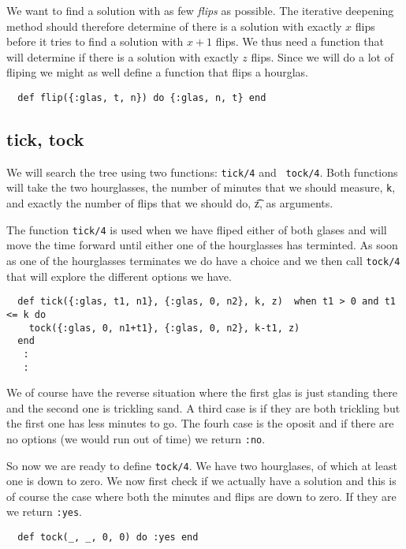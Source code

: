\documentclass[a4paper,11pt]{article}
\begin{document}
We want to find a solution with as few {\em flips} as
possible. The iterative deepening method should therefore determine of
there is a solution with exactly $x$ flips before it tries to find a
solution with $x+1$ flips. We thus need a function that will determine
if there is a solution with exactly $z$ flips. Since we will do a lot
of fliping we might as well define a function that flips a hourglas.

\begin{verbatim}
  def flip({:glas, t, n}) do {:glas, n, t} end  
\end{verbatim}

\subsection*{tick, tock}

We will search the tree using two functions: {\tt tick/4} and {\tt
  tock/4}. Both functions will take the two hourglasses, the number of
minutes that we should measure, {\tt k}, and exactly the number of
flips that we should do, {\t z}, as arguments.

The function {\tt tick/4} is used when we have fliped either of both
glases and will move the time forward until either one of the
hourglasses has terminted.  As soon as one of the hourglasses
terminates we do have a choice and we then call {\tt tock/4} that will
explore the different options we have.

\begin{verbatim}
  def tick({:glas, t1, n1}, {:glas, 0, n2}, k, z)  when t1 > 0 and t1 <= k do  
    tock({:glas, 0, n1+t1}, {:glas, 0, n2}, k-t1, z)
  end
   :
   :
\end{verbatim}

We of course have the reverse situation where the first glas is just
standing there and the second one is trickling sand. A third case is
if they are both trickling but the first one has less minutes to
go. The fourh case is the oposit and if there are no options (we would
run out of time) we return {\tt :no}.

So now we are ready to define {\tt tock/4}. We have two hourglases, of
which at least one is down to zero. We now first check if we actually
have a solution and this is of course the case where both the minutes
and flips are down to zero. If they are we return {\tt :yes}.

\begin{verbatim}
  def tock(_, _, 0, 0) do :yes end
\end{verbatim}
\end{document}
